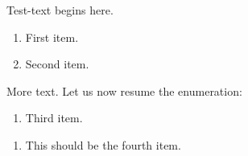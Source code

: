 \documentclass{beamer}
\newcounter{ResumeEnumerate}
\begin{document}
\begin{frame}
   Test-text begins here.
   \begin{enumerate}
      \item First item.
      \item Second item.
   \end{enumerate}
   More text. Let us now resume the enumeration:
   \begin{enumerate}[resume]
      \item Third item.
   \end{enumerate}
   \setcounter{ResumeEnumerate}{\value{enumi}}
\end{frame}
\begin{frame}
   \begin{enumerate}[start=\numexpr\value{ResumeEnumerate}+1]
      \item This should be the fourth item.
   \end{enumerate}
\end{frame}   
\end{document}
